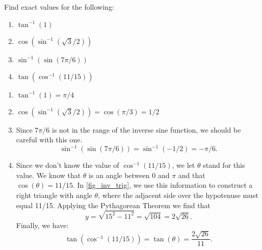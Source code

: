 \begin{example}\label{eg_inv_trig}
Find exact values for the following:
\\
\begin{minipage}{.5\linewidth}
\begin{enumerate}
 \item $\tan^{-1}(1)$
 \item $\cos(\sin^{-1}(\sqrt3/2))$
\end{enumerate}
\end{minipage}%
\begin{minipage}{.5\linewidth}
\begin{enumerate}
 \setcounter{enumi}{2}
 \item $\sin^{-1}(\sin(7\pi/6))$
 \item $\tan(\cos^{-1}(11/15))$
\end{enumerate}
\end{minipage}
\solution
\begin{enumerate}
\item $\tan^{-1}(1)=\pi/4$
\item $\cos(\sin^{-1}(\sqrt3/2))=\cos(\pi/3)=1/2$
\item Since $7\pi/6$ is not in the range of the inverse sine function, we should be careful with this one.
\[\sin^{-1}(\sin(7\pi/6))=\sin^{-1}(-1/2)=-\pi/6.\]
\item Since we don't know the value of $\cos^{-1}(11/15)$, we let $\theta$ stand for this value. We know that $\theta$ is an angle between $0$ and $\pi$ and that $\cos(\theta)=11/15$.
In \autoref{fig_inv_trig}, we use this information to construct a right triangle with angle $\theta$, where the adjacent side over the hypotenuse must equal 11/15. Applying the Pythagorean Theorem we find that
\[y=\sqrt{15^2-11^2}=\sqrt{104}=2\sqrt{26}.\]
Finally, we have:
\[\tan(\cos^{-1}(11/15))=\tan(\theta)=\frac{2\sqrt{26}}{11}.\]
\end{enumerate}
\end{example}



